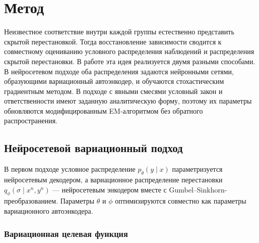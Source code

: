 \section{Метод}
\label{sec:Method} 

Неизвестное соответствие внутри каждой группы естественно представить скрытой
перестановкой. Тогда восстановление зависимости сводится к совместному оцениванию
условного распределения наблюдений и распределения скрытой перестановки. В работе эта идея
реализуется двумя разными способами. В нейросетевом подходе оба распределения задаются
нейронными сетями, образующими вариационный автоэнкодер, и обучаются стохастическим
градиентным методом. В подходе с явными смесями условный закон и ответственности имеют
заданную аналитическую форму, поэтому их параметры обновляются модифицированным
EM-алгоритмом без обратного распространения.

\subsection{Нейросетевой вариационный подход}

В первом подходе условное распределение $p_\theta(y\mid x)$ параметризуется нейросетевым
декодером, а вариационное распределение перестановки
$q_\phi(\sigma\mid x^n,y^n)$ --- нейросетевым энкодером вместе с
Gumbel--Sinkhorn-преобразованием. Параметры $\theta$ и $\phi$ оптимизируются совместно как
параметры вариационного автоэнкодера.

\subsubsection{Вариационная целевая функция}
\label{ssec:nelbo}

